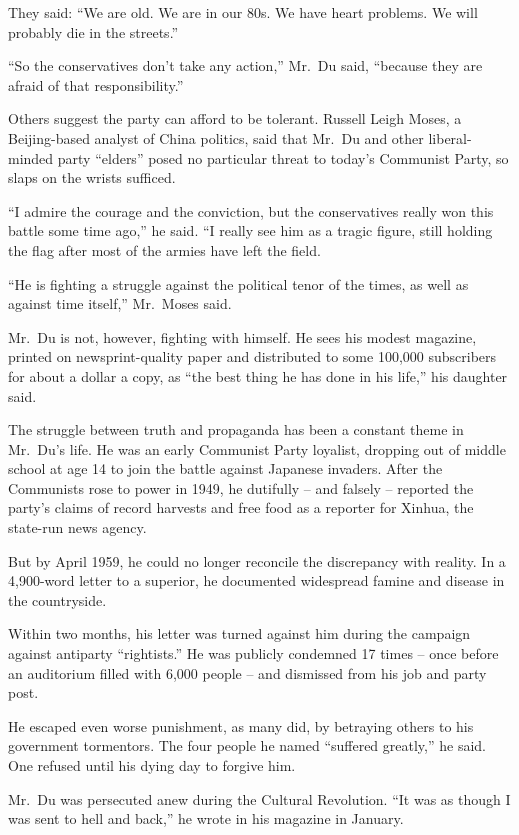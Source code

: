 ﻿\documentclass[12pt]{article}
\begin{document}
They said: ``We are old. We are in our 80s. We have heart problems. We will probably die in the
streets.''

``So the conservatives don't take any action,'' Mr.~Du said, ``because they are afraid of that
responsibility.''

Others suggest the party can afford to be tolerant. Russell Leigh Moses, a Beijing-based analyst of
China politics, said that Mr.~Du and other liberal-minded party ``elders'' posed no particular
threat to today's Communist Party, so slaps on the wrists sufficed.

``I admire the courage and the conviction, but the conservatives really won this battle some time
ago,'' he said. ``I really see him as a tragic figure, still holding the flag after most of the
armies have left the field.

``He is fighting a struggle against the political tenor of the times, as well as against time
itself,'' Mr.~Moses said.

Mr.~Du is not, however, fighting with himself. He sees his modest magazine, printed on
newsprint-quality paper and distributed to some 100,000 subscribers for about a dollar a copy, as
``the best thing he has done in his life,'' his daughter said.

The struggle between truth and propaganda has been a constant theme in Mr.~Du's life. He was an
early Communist Party loyalist, dropping out of middle school at age 14 to join the battle against
Japanese invaders. After the Communists rose to power in 1949, he dutifully -- and falsely --
reported the party's claims of record harvests and free food as a reporter for Xinhua, the state-run
news agency.

But by April 1959, he could no longer reconcile the discrepancy with reality. In a 4,900-word letter
to a superior, he documented widespread famine and disease in the countryside.

Within two months, his letter was turned against him during the campaign against antiparty
``rightists.'' He was publicly condemned 17 times -- once before an auditorium filled with 6,000
people -- and dismissed from his job and party post.

He escaped even worse punishment, as many did, by betraying others to his government tormentors. The
four people he named ``suffered greatly,'' he said. One refused until his dying day to forgive him.

Mr.~Du was persecuted anew during the Cultural Revolution. ``It was as though I was sent to hell and
back,'' he wrote in his magazine in January.
\end{document}
